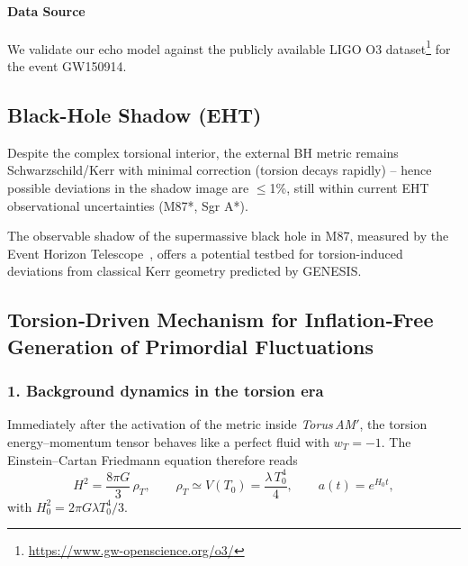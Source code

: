 \documentclass{article}
\begin{document}
\paragraph{Data Source}
We validate our echo model against the publicly available LIGO O3 dataset\footnote{\url{https://www.gw-openscience.org/o3/}} for the event GW150914.

\subsection{Black-Hole Shadow (EHT)}
Despite the complex torsional interior, the external BH metric remains Schwarzschild/Kerr with minimal correction (torsion decays rapidly) – hence possible deviations in the shadow image are $\leq$1\%, still within current EHT observational uncertainties (M87*, Sgr A*).

The observable shadow of the supermassive black hole in M87, measured by the Event Horizon Telescope~\cite{eht2019}, offers a potential testbed for torsion-induced deviations from classical Kerr geometry predicted by GENESIS.


\medskip
\begin{center}
\end{center}
\medskip



\subsection{Torsion‑Driven Mechanism for Inflation‑Free
Generation of Primordial Fluctuations}
\label{sec:torsion_flucs}

\subsubsection*{1. Background dynamics in the torsion era}

Immediately after the activation of the metric inside
\textit{Torus AM$'$}, the torsion energy–momentum tensor behaves
like a perfect fluid with
$w_{T}=-1$.  The Einstein–Cartan Friedmann equation therefore reads
\begin{equation}
  H^{2}=\frac{8\pi G}{3}\,\rho_{T},\qquad
  \rho_{T}\simeq V(T_{0})
  =\frac{\lambda\,T_{0}^{4}}{4},
  \qquad
  a(t)=e^{H_{0}t},
\end{equation}
with
$H_{0}^{2}=2\pi G\lambda T_{0}^{4}/3$.
\end{document}
